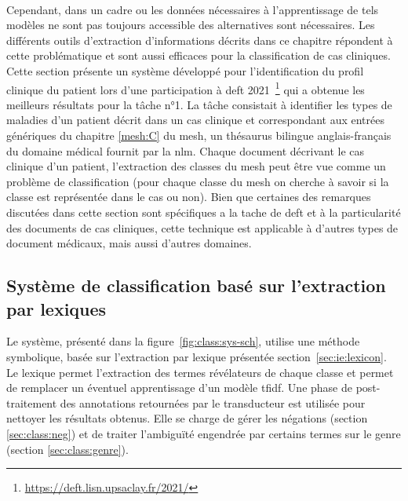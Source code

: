 \paragraph{}
Cependant, dans un cadre ou les données nécessaires à l'apprentissage de tels modèles ne sont pas toujours accessible des alternatives sont nécessaires.
Les différents outils d'extraction d'informations décrits dans ce chapitre répondent à cette problématique et sont aussi efficaces pour la classification de cas cliniques.
Cette section présente un système développé pour l'identification du profil clinique du patient \cite{hiotDOINGDEFTUtilisation2021} lors d'une participation à \gls{deft} 2021~\footnote{\url{https://deft.lisn.upsaclay.fr/2021/}} \cite{grouinClassificationCasCliniques2021} qui a obtenue les meilleurs résultats pour la tâche n°1.
La tâche consistait à identifier les types de maladies d'un patient décrit dans un cas clinique et correspondant aux entrées génériques du chapitre \ref{mesh:C} du \gls{mesh}, un thésaurus bilingue anglais-français du domaine médical fournit par la \gls{nlm}.
Chaque document décrivant le cas clinique d'un patient, l'extraction des classes du \gls{mesh} peut être vue comme un problème de classification (pour chaque classe du \gls{mesh} on cherche à savoir si la classe est représentée dans le cas ou non).
Bien que certaines des remarques discutées dans cette section sont spécifiques a la tache de \gls{deft} et à la particularité des documents de cas cliniques, cette technique est applicable à d'autres types de document médicaux, mais aussi d'autres domaines.

\subsection{Système de classification basé sur l'extraction par lexiques}
Le système, présenté dans la figure~\ref{fig:class:sys-sch}, utilise une méthode symbolique, basée sur l'extraction par lexique présentée section~\ref{sec:ie:lexicon}.
Le lexique permet l'extraction des termes révélateurs de chaque classe et permet de remplacer un éventuel apprentissage d'un modèle \gls{tfidf}.
Une phase de post-traitement des annotations retournées par le transducteur est utilisée pour nettoyer les résultats obtenus.
Elle se charge de gérer les négations (section \ref{sec:class:neg}) et de traiter l'ambiguïté engendrée par certains termes sur le genre (section \ref{sec:class:genre}).

